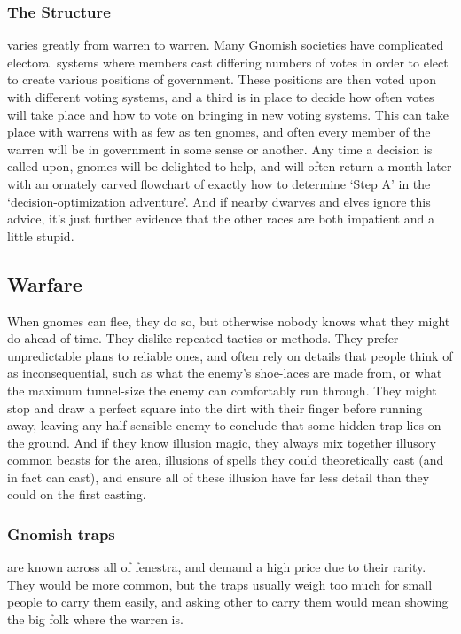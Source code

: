 \begin{multicols}{2}
\subsubsection{The Structure}
varies greatly from warren to warren.
Many Gnomish societies have complicated electoral systems where members cast differing numbers of votes in order to elect to create various positions of government.
These positions are then voted upon with different voting systems, and a third is in place to decide how often votes will take place and how to vote on bringing in new voting systems.
This can take place with warrens with as few as ten gnomes, and often every member of the warren will be in government in some sense or another.
Any time a decision is called upon, gnomes will be delighted to help, and will often return a month later with an ornately carved flowchart of exactly how to determine `Step A' in the `decision-optimization adventure'.
And if nearby dwarves and elves ignore this advice, it's just further evidence that the other races are both impatient and a little stupid.

\subsection{Warfare}

When gnomes can flee, they do so, but otherwise nobody knows what they might do ahead of time.
They dislike repeated tactics or methods.
They prefer unpredictable plans to reliable ones, and often rely on details that people think of as inconsequential, such as what the enemy's shoe-laces are made from, or what the maximum tunnel-size the enemy can comfortably run through.
They might stop and draw a perfect square into the dirt with their finger before running away, leaving any half-sensible enemy to conclude that some hidden trap lies on the ground.
And if they know illusion magic, they always mix together illusory common beasts for the area, illusions of spells they could theoretically cast (and in fact can cast), and ensure all of these illusion have far less detail than they could on the first casting.

\subsubsection{Gnomish traps}
are known across all of \gls{fenestra}, and demand a high price due to their rarity.
They would be more common, but the traps usually weigh too much for small people to carry them easily, and asking other to carry them would mean showing the big folk where the warren is.


\end{multicols}
